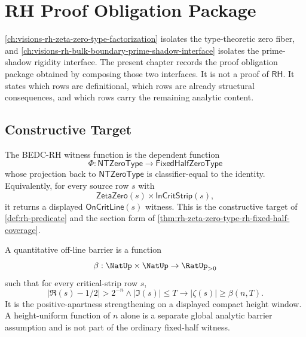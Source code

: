 \chapter{RH Proof Obligation Package}
\label{ch:visions-rh-proof-obligation-package}

\autoref{ch:visions-rh-zeta-zero-type-factorization} isolates the
type-theoretic zero fiber, and
\autoref{ch:visions-rh-bulk-boundary-prime-shadow-interface} isolates the
prime-shadow rigidity interface. The present chapter records the proof
obligation package obtained by composing those two interfaces. It is not a
proof of $\mathsf{RH}$. It states which rows are definitional, which rows
are already structural consequences, and which rows carry the remaining
analytic content.

\section{Constructive Target}
\label{sec:rh-proof-obligation-constructive-target}

\begin{definition}
\label{def:rh-proof-obligation-witness-function}
The BEDC-RH witness function is the dependent function
$$
\Phi:
\mathsf{NTZeroType}\to\mathsf{FixedHalfZeroType}
$$
whose projection back to $\mathsf{NTZeroType}$ is classifier-equal to the
identity. Equivalently, for every source row $s$ with
$$
\mathsf{ZetaZero}(s)\times\mathsf{InCritStrip}(s),
$$
it returns a displayed $\mathsf{OnCritLine}(s)$ witness. This is the
constructive target of \autoref{def:rh-predicate} and the section form of
\autoref{thm:rh-zeta-zero-type-rh-fixed-half-coverage}.
\end{definition}

\begin{definition}
\label{def:rh-proof-obligation-quantitative-barrier}
A quantitative off-line barrier is a function
$$
\beta:\NatUp\times\NatUp\to\RatUp_{>0}
$$
such that for every critical-strip row $s$,
$$
|\Re(s)-1/2|>2^{-n}
\wedge
|\Im(s)|\le T
\to
|\zeta(s)|\ge \beta(n,T).
$$
It is the positive-apartness strengthening on a displayed compact height
window. A height-uniform function of $n$ alone is a separate global analytic
barrier assumption and is not part of the ordinary fixed-half witness.
\end{definition}

